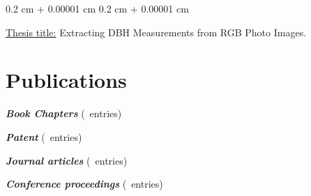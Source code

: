 \documentclass[10pt, a4paper]{article}
\newcounter{bookchapcount}
\newcounter{journalcount}
\newcounter{confcount}
\newcounter{patentcount}
\newenvironment{highlights}{
    \begin{itemize}[
        topsep=0.10 cm,
        parsep=0.10 cm,
        partopsep=0pt,
        itemsep=0pt,
        leftmargin=0.4 cm + 10pt
    ]
}{
    \end{itemize}
} %
\newenvironment{onecolentry}{
    \begin{adjustwidth}{
        0.2 cm + 0.00001 cm
    }{
        0.2 cm + 0.00001 cm
    }
}{
    \end{adjustwidth}
} %
\newenvironment{twocolentry}[2][]{
    \onecolentry
    \def\secondColumn{#2}
    \setcolumnwidth{\fill, 4.5 cm}
    \begin{paracol}{2}
}{
    \switchcolumn \raggedleft \secondColumn
    \end{paracol}
    \endonecolentry
} %
\let\hrefWithoutArrow\href
\renewcommand{\href}[2]{\hrefWithoutArrow{#1}{\ifthenelse{\equal{#2}{}}{ }{#2 }\raisebox{.15ex}{\footnotesize \faExternalLink*}}}
\begin{document}
        \vspace{0.10 cm}
        \begin{onecolentry}
            \underline{Thesis title:} Extracting DBH Measurements from RGB Photo Images.
        \end{onecolentry}
    
    \section{Publications}
        \nocite{*}

        \vspace{0.10 cm}
        \textbf{\textit{Book Chapters}} (\thebookchapcount\ entries)
        \printbibliography[type=incollection, heading=none] %

        \vspace{0.10 cm}
        \textbf{\textit{Patent}} (\thepatentcount\ entries)
        \printbibliography[type=patent, heading=none] %

        \vspace{0.10 cm}
        \textbf{\textit{Journal articles}} (\thejournalcount\ entries)
        \printbibliography[type=article, heading=none] %

        \vspace{0.10 cm}
        \textbf{\textit{Conference proceedings}} (\theconfcount\ entries)
        \printbibliography[filter=conference, heading=none] %
        




\end{document}
